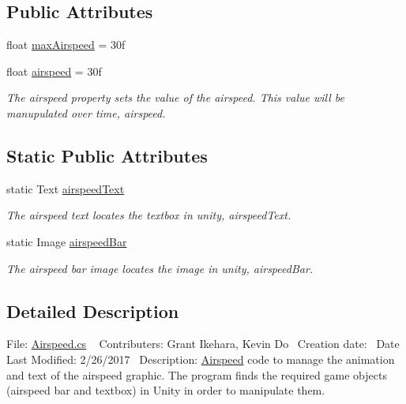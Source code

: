 \subsection*{Public Attributes}
\begin{DoxyCompactItemize}
\item 
float \hyperlink{class_airspeed_a670ab8ceb6bf47a56d83ace7ab46d119}{max\+Airspeed} = 30f
\item 
float \hyperlink{class_airspeed_abf040dee278544fcfa5736e89d7d8686}{airspeed} = 30f
\begin{DoxyCompactList}\small\item\em The airspeed property sets the value of the airspeed. This value will be manupulated over time, airspeed. \end{DoxyCompactList}\end{DoxyCompactItemize}
\subsection*{Static Public Attributes}
\begin{DoxyCompactItemize}
\item 
static Text \hyperlink{class_airspeed_a249c74d2a58b5947d27f35fa29ee20f1}{airspeed\+Text}
\begin{DoxyCompactList}\small\item\em The airspeed text locates the textbox in unity, airspeed\+Text. \end{DoxyCompactList}\item 
static Image \hyperlink{class_airspeed_a7fc2cbbc48005b31a2f43b4ffac4de20}{airspeed\+Bar}
\begin{DoxyCompactList}\small\item\em The airspeed bar image locates the image in unity, airspeed\+Bar. \end{DoxyCompactList}\end{DoxyCompactItemize}


\subsection{Detailed Description}
File\+: \hyperlink{_airspeed_8cs}{Airspeed.\+cs} ~\newline
Contributers\+: Grant Ikehara, Kevin Do~\newline
Creation date\+:~\newline
Date Last Modified\+: 2/26/2017~\newline
Description\+: \hyperlink{class_airspeed}{Airspeed} code to manage the animation and text of the airspeed graphic. The program finds the required game objects (airspeed bar and textbox) in Unity in order to manipulate them. 



